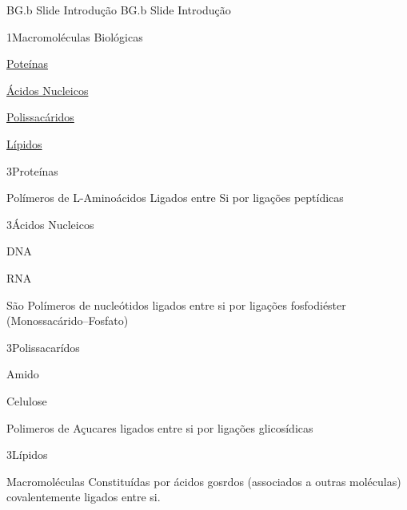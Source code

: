 \documentclass[\mainfilename]{subfiles}
\begin{document}
{BG.b Slide Introdução}
{BG.b Slide Introdução}

\begin{sectionBox}1{Macromoléculas Biológicas}
    
    \begin{enumerate}[label=(\roman*)]
        \begin{multicols}{2}
            \item \hyperref[Proteinas]       {Poteínas}
            \item \hyperref[Acidos_Nucleicos]{Ácidos Nucleicos}
            \item \hyperref[Polissacaridos]  {Polissacáridos}
            \item \hyperref[Lipidos]         {Lípidos}
        \end{multicols}
    \end{enumerate}
    
    \begin{sectionBox}3{Proteínas}
        
        Polímeros de L-Aminoácidos Ligados entre Si por ligações peptídicas
        
    \end{sectionBox}
    
    \begin{sectionBox}3{Ácidos Nucleicos}
        
        \begin{itemize}
            \begin{multicols}{2}
                \item DNA
                \item RNA
            \end{multicols}
        \end{itemize}
    
        São Polímeros de nucleótidos ligados entre si por ligações fosfodiéster (Monossacárido--Fosfato)
        
    \end{sectionBox}
    
    \begin{sectionBox}3{Polissacarídos}
        
        \begin{itemize}
            \begin{multicols}{2}
                \item Amido
                \item Celulose
            \end{multicols}
        \end{itemize}
    
        Polimeros de Açucares ligados entre si por ligações glicosídicas
        
    \end{sectionBox}
    
    \begin{sectionBox}3{Lípidos}
        
        Macromoléculas Constituídas por ácidos gosrdos (associados a outras moléculas) covalentemente ligados entre si.
        
    \end{sectionBox}

\end{sectionBox}
\end{document}
